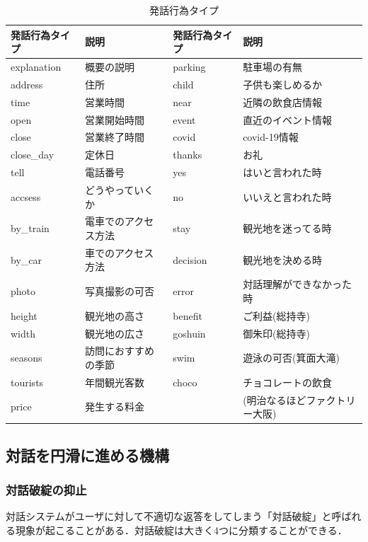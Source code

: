 \begin{table}[htb]
    \caption{発話行為タイプ}
    \label{sendrecv}
    \centering
    \begin{tabular}{l|l||l|l}
    \hline
    発話行為タイプ     & 説明        & 発話行為タイプ  & 説明\\\hline
    explanation & 概要の説明      & parking  & 駐車場の有無\\
    address     & 住所         & child    & 子供も楽しめるか\\
    time        & 営業時間       & near     & 近隣の飲食店情報\\
    open        & 営業開始時間     & event    & 直近のイベント情報\\
    close       & 営業終了時間     & covid    & covid-19情報\\
    close\_day  & 定休日        & thanks   & お礼\\
    tell        & 電話番号       & yes      & はいと言われた時\\
    accsess     & どうやっていくか   & no       & いいえと言われた時\\
    by\_train   & 電車でのアクセス方法 & stay     & 観光地を迷ってる時 \\
    by\_car     & 車でのアクセス方法  & decision & 観光地を決める時\\
    photo       & 写真撮影の可否    & error    & 対話理解ができなかった時\\
    height      & 観光地の高さ     & benefit  & ご利益(総持寺)\\
    width       & 観光地の広さ    & goshuin  & 御朱印(総持寺)\\
    seasons     & 訪問におすすめの季節 & swim     & 遊泳の可否(箕面大滝)\\ 
    tourists    & 年間観光客数     & choco    & チョコレートの飲食\\
    price       & 発生する料金　&　&(明治なるほどファクトリー大阪) \\
\hline
    \end{tabular}   
\end{table}



\subsection{対話を円滑に進める機構}
\subsubsection{対話破綻の抑止}
対話システムがユーザに対して不適切な返答をしてしまう「対話破綻」と呼ばれる現象が起こることがある．対話破綻は大きく4つに分類することができる\cite{challenge2015}．


